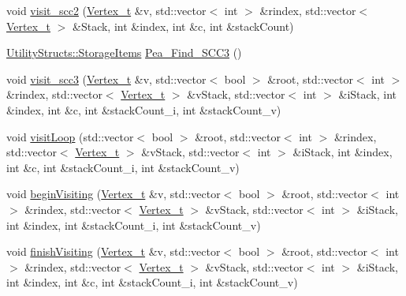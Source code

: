 \begin{DoxyCompactItemize}
\item 
void \hyperlink{class_pearce_a12c836f8f0dbd85e20c0f3f4f0c5fb47}{visit\+\_\+scc2} (\hyperlink{class_graph_component_ae67114a6ce5a001dc35e1996e1b45aa0}{Vertex\+\_\+t} \&v, std\+::vector$<$ int $>$ \&rindex, std\+::vector$<$ \hyperlink{class_graph_component_ae67114a6ce5a001dc35e1996e1b45aa0}{Vertex\+\_\+t} $>$ \&Stack, int \&index, int \&c, int \&stack\+Count)
\item 
\hyperlink{struct_utility_structs_1_1_storage_items}{Utility\+Structs\+::\+Storage\+Items} \hyperlink{class_pearce_a9d49726ab058f24cc943135458edb4f9}{Pea\+\_\+\+Find\+\_\+\+S\+C\+C3} ()
\item 
void \hyperlink{class_pearce_a70800d4564b36fb64762d3a78f1f67d8}{visit\+\_\+scc3} (\hyperlink{class_graph_component_ae67114a6ce5a001dc35e1996e1b45aa0}{Vertex\+\_\+t} \&v, std\+::vector$<$ bool $>$ \&root, std\+::vector$<$ int $>$ \&rindex, std\+::vector$<$ \hyperlink{class_graph_component_ae67114a6ce5a001dc35e1996e1b45aa0}{Vertex\+\_\+t} $>$ \&v\+Stack, std\+::vector$<$ int $>$ \&i\+Stack, int \&index, int \&c, int \&stack\+Count\+\_\+i, int \&stack\+Count\+\_\+v)
\item 
void \hyperlink{class_pearce_a323fc3337d5849680065986d6ef7163c}{visit\+Loop} (std\+::vector$<$ bool $>$ \&root, std\+::vector$<$ int $>$ \&rindex, std\+::vector$<$ \hyperlink{class_graph_component_ae67114a6ce5a001dc35e1996e1b45aa0}{Vertex\+\_\+t} $>$ \&v\+Stack, std\+::vector$<$ int $>$ \&i\+Stack, int \&index, int \&c, int \&stack\+Count\+\_\+i, int \&stack\+Count\+\_\+v)
\item 
void \hyperlink{class_pearce_ab9090eeb4466701bc8ba913d8f9f5b50}{begin\+Visiting} (\hyperlink{class_graph_component_ae67114a6ce5a001dc35e1996e1b45aa0}{Vertex\+\_\+t} \&v, std\+::vector$<$ bool $>$ \&root, std\+::vector$<$ int $>$ \&rindex, std\+::vector$<$ \hyperlink{class_graph_component_ae67114a6ce5a001dc35e1996e1b45aa0}{Vertex\+\_\+t} $>$ \&v\+Stack, std\+::vector$<$ int $>$ \&i\+Stack, int \&index, int \&stack\+Count\+\_\+i, int \&stack\+Count\+\_\+v)
\item 
void \hyperlink{class_pearce_a48afb6ccb75ba9df285c9701daf474b0}{finish\+Visiting} (\hyperlink{class_graph_component_ae67114a6ce5a001dc35e1996e1b45aa0}{Vertex\+\_\+t} \&v, std\+::vector$<$ bool $>$ \&root, std\+::vector$<$ int $>$ \&rindex, std\+::vector$<$ \hyperlink{class_graph_component_ae67114a6ce5a001dc35e1996e1b45aa0}{Vertex\+\_\+t} $>$ \&v\+Stack, std\+::vector$<$ int $>$ \&i\+Stack, int \&index, int \&c, int \&stack\+Count\+\_\+i, int \&stack\+Count\+\_\+v)

\end{DoxyCompactItemize}
